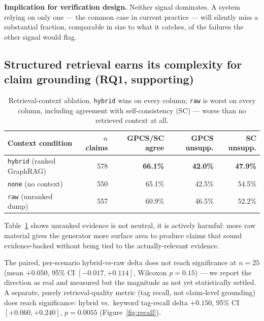 \documentclass{article}
\begin{document}
\textbf{Implication for verification design.} Neither signal dominates. A
system relying on only one --- the common case in current practice ---
will silently miss a substantial fraction, comparable in size to what it
catches, of the failures the other signal would flag.

\subsection{Structured retrieval earns its complexity for claim grounding (RQ1, supporting)}
\label{sec:results-retrieval}

\begin{table}[t]
    \centering
    \caption{Retrieval-context ablation. \texttt{hybrid} wins on every
    column; \texttt{raw} is worst on every column, including agreement
    with self-consistency (SC) --- worse than no retrieved context at all.}
    \label{tab:context-ablation}
    \small
    \setlength{\tabcolsep}{4.5pt}
    \begin{tabular}{lrrrr}
        \toprule
        Context condition & $n$ claims & GPCS/SC agree & GPCS unsupp. & SC unsupp. \\
        \midrule
        \texttt{hybrid} (ranked GraphRAG) & 578 & \textbf{66.1\%} & \textbf{42.0\%} & \textbf{47.9\%} \\
        \texttt{none} (no context)        & 550 & 65.1\%          & 42.5\%          & 54.5\%          \\
        \texttt{raw} (unranked dump)      & 557 & 60.9\%          & 46.5\%          & 52.2\%          \\
        \bottomrule
    \end{tabular}
\end{table}

Table~\ref{tab:context-ablation} shows unranked evidence is not neutral,
it is actively harmful: more raw material gives the generator more
surface area to produce claims that sound evidence-backed without being
tied to the actually-relevant evidence.

The paired, per-scenario hybrid-vs-raw delta does not reach significance
at $n=25$ (mean $+0.050$, 95\% CI $[-0.017, +0.114]$, Wilcoxon $p=0.15$)
--- we report the direction as real and measured but the magnitude as not
yet statistically settled. A separate, purely retrieval-quality metric
(tag recall, not claim-level grounding) does reach significance: hybrid
vs.\ keyword tag-recall delta $+0.150$, 95\% CI $[+0.060, +0.240]$,
$p=0.0055$ (Figure~\ref{fig:recall}).
\end{document}

